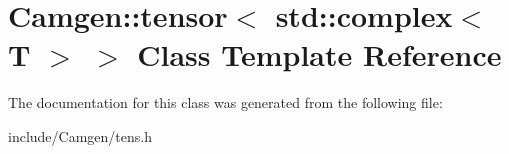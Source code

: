 \hypertarget{a00527}{\section{Camgen\-:\-:tensor$<$ std\-:\-:complex$<$ T $>$ $>$ Class Template Reference}
\label{a00527}
}


The documentation for this class was generated from the following file\-:\begin{DoxyCompactItemize}
\item 
include/\-Camgen/tens.\-h\end{DoxyCompactItemize}
